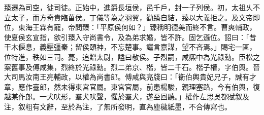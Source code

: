 \begin{pinyinscope}
臻遷為司空，徙司徒。正始中，進爵長垣侯，邑千戶，封一子列侯。初，太祖乆不立太子，而方奇貴臨菑侯。丁儀等為之羽翼，勸臻自結，臻以大義拒之。及文帝即位，東海王霖有寵，帝問臻：「平原侯何如？」臻稱明德美而終不言。曹爽輔政，使夏侯玄宣指，欲引臻入守尚書令，及為弟求婚，皆不許。固乞遜位。詔曰：「昔干木偃息，義壓彊秦；留侯頤神，不忘楚事。讜言嘉謀，望不吝焉。」賜宅一區，位特進，秩如三司。薨，追贈太尉，謚曰敬侯。子烈嗣，咸熈中為光祿勳。臣松之案舊事及傅咸集，烈終於光祿勳。烈二弟京、楷，皆二千石。楷子權，字伯輿。晉大司馬汝南王亮輔政，以權為尚書郎。傅咸與亮牋曰：「衞伯輿貴妃兄子，誠有才章，應作臺郎，然未得東宮官屬。東宮官屬，前患楊駿，親理塞路，今有伯輿，復越某作郎。一犬吠形，羣犬吠聲，懼於羣犬，遂至回聽。」權作左思吳都賦叙及注，叙粗有文辭，至於為注，了無所發明，直為塵穢紙墨，不合傳寫也。


\end{pinyinscope}